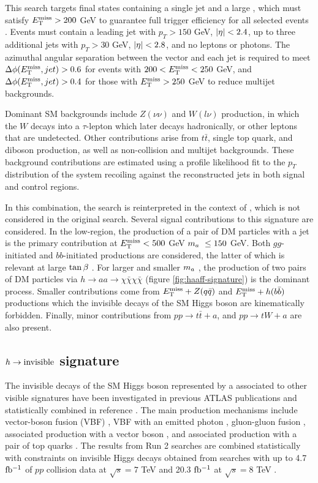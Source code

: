 This search targets final states containing a single jet and a large \met, which must satisfy $E_{\mathrm{T}}^{\mathrm{miss}}>200$ GeV to guarantee full \met trigger efficiency for all selected events \cite{EXOT-2018-06}. Events must contain a leading jet with $p_T>150$ GeV, $\abs{\eta} < 2.4$, up to three additional jets with $p_T>30$ GeV, $\abs{\eta} < 2.8$, and no leptons or photons. The azimuthal angular separation between the \met vector and each jet is required to meet $\Delta\phi(E_{\mathrm{T}}^{\mathrm{miss}}, jet) > 0.6$ for events with $200 < E_{\mathrm{T}}^{\mathrm{miss}} < 250$ GeV, and $\Delta\phi(E_{\mathrm{T}}^{\mathrm{miss}}, jet) > 0.4$ for those with $E_{\mathrm{T}}^{\mathrm{miss}} > 250$ GeV to reduce multijet backgrounds. 

Dominant SM backgrounds include $Z(\nu\nu)$ and $W(l\nu)$ production, in which the $W$ decays into a $\tau$-lepton which later decays hadronically, or other leptons that are undetected. Other contributions arise from $t\bar{t}$, single top quark, and diboson production, as well as non-collision and multijet backgrounds. These background contributions are estimated using a profile likelihood fit to the $p_T$ distribution of the system recoiling against the reconstructed jets in both signal and control regions.

In this combination, the search is reinterpreted in the context of \hdma, which is not considered in the original search. Several signal contributions to this signature are considered. In the low-\met region, the production of a pair of DM particles with a jet is the primary contribution at $E_{\mathrm{T}}^{\mathrm{miss}}< 500$ GeV $m_a~\le 150$ GeV. Both $gg$-initiated and $bb$-initiated productions are considered, the latter of which is relevant at large $\tan\beta~$. For larger \met and smaller $m_a~$, the production of two pairs of DM particles via $h\rightarrow aa \rightarrow \chi\bar{\chi}\chi\bar{\chi}$ (figure \ref{fig:haaff-signature}) is the dominant process. Smaller contributions come from $E_{\mathrm{T}}^{\mathrm{miss}}+Z(q\bar{q})$ and $E_{\mathrm{T}}^{\mathrm{miss}} + h(b\bar{b})$ productions which the invisible decays of the SM Higgs boson are kinematically forbidden. Finally, minor contributions from $pp\rightarrow t\bar{t} +a$, and $pp\rightarrow tW+a$ are also present.

\subsection{\texorpdfstring{$h\rightarrow \mathrm{invisible}$}{TEXT} signature}

The invisible decays of the SM Higgs boson represented by a \met associated to other visible signatures have been investigated in previous ATLAS publications and statistically combined in reference \cite{HIGG-2021-05}. The main production mechanisms include vector-boson fusion (VBF) \cite{EXOT-2020-11}, VBF with an emitted photon \cite{EXOT-2021-17}, gluon-gluon fusion \cite{EXOT-2018-06}, associated production with a vector boson \cite{HIGG-2018-26}, and associated production with a pair of top quarks \cite{SUSY-2019-12}. The results from Run 2 searches are combined statistically with constraints on invisible Higgs decays obtained from searches with up to 4.7 $\mbox{fb\(^{-1}\)}$ of $pp$ collision data at $\sqrt{s}=7$ TeV and 20.3 $\mbox{fb\(^{-1}\)}$ at $\sqrt{s}=8$ TeV \cite{HIGG-2015-03}. 


